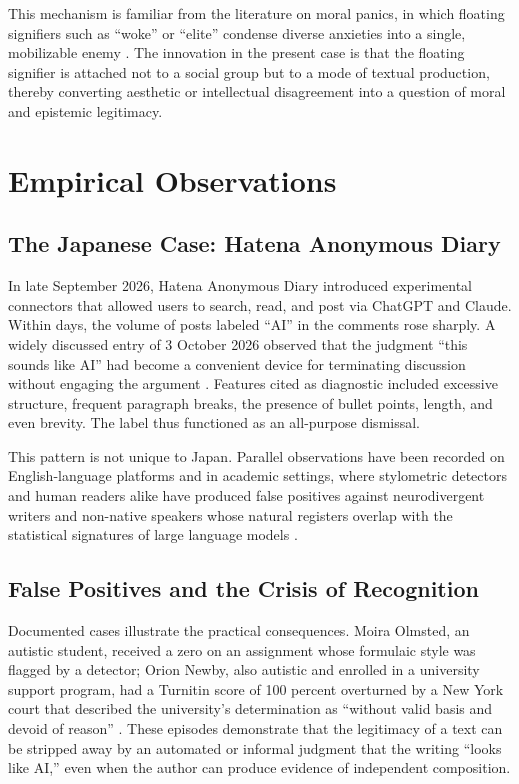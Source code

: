 \documentclass[12pt,a4paper]{article}
\begin{document}
This mechanism is familiar from the literature on moral panics, in which floating signifiers such as ``woke'' or ``elite'' condense diverse anxieties into a single, mobilizable enemy \citep{prindle2023}. The innovation in the present case is that the floating signifier is attached not to a social group but to a mode of textual production, thereby converting aesthetic or intellectual disagreement into a question of moral and epistemic legitimacy.

\section{Empirical Observations}

\subsection{The Japanese Case: Hatena Anonymous Diary}

In late September 2026, Hatena Anonymous Diary introduced experimental connectors that allowed users to search, read, and post via ChatGPT and Claude. Within days, the volume of posts labeled ``AI'' in the comments rose sharply. A widely discussed entry of 3 October 2026 observed that the judgment ``this sounds like AI'' had become a convenient device for terminating discussion without engaging the argument \citep{anond20261003}. Features cited as diagnostic included excessive structure, frequent paragraph breaks, the presence of bullet points, length, and even brevity. The label thus functioned as an all-purpose dismissal.

This pattern is not unique to Japan. Parallel observations have been recorded on English-language platforms and in academic settings, where stylometric detectors and human readers alike have produced false positives against neurodivergent writers and non-native speakers whose natural registers overlap with the statistical signatures of large language models \citep{gradpilot2026,bloomberg2024,newby2026}.

\subsection{False Positives and the Crisis of Recognition}

Documented cases illustrate the practical consequences. Moira Olmsted, an autistic student, received a zero on an assignment whose formulaic style was flagged by a detector; Orion Newby, also autistic and enrolled in a university support program, had a Turnitin score of 100 percent overturned by a New York court that described the university's determination as ``without valid basis and devoid of reason'' \citep{newby2026,gradpilot2026}. These episodes demonstrate that the legitimacy of a text can be stripped away by an automated or informal judgment that the writing ``looks like AI,'' even when the author can produce evidence of independent composition.
\end{document}
